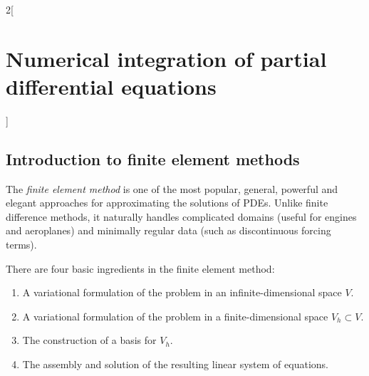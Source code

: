 \documentclass[../../../main_math.tex]{subfiles}
\begin{document}
\begin{multicols}{2}[\section{Numerical integration of partial differential equations}]
  \subsection{Introduction to finite element methods}
  \begin{definition}
    The \emph{finite element method} is one of the most popular, general,
    powerful and elegant approaches for approximating the solutions of
    PDEs. Unlike finite difference methods, it naturally handles complicated domains (useful for engines and aeroplanes) and minimally
    regular data (such as discontinuous forcing terms).

    There are four basic ingredients in the finite element method:
    \begin{enumerate}
      \item A variational formulation of the problem in an infinite-dimensional space $V$.
      \item A variational formulation of the problem in a finite-dimensional space $V_h\subset V$.
      \item The construction of a basis for $V_h$.
      \item The assembly and solution of the resulting linear system of equations.
    \end{enumerate}
  \end{definition}

\end{multicols}
\end{document}
